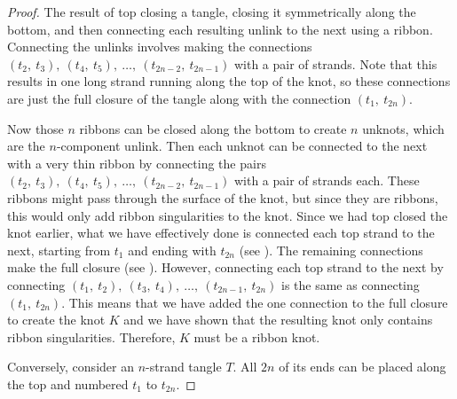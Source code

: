\begin{paper}
\begin{proof}
{The result of top closing a tangle, closing it symmetrically
along the bottom, and then connecting each resulting unlink to the next using a
ribbon.
Connecting the unlinks involves making the connections
$(t_2,~t_3),~(t_4,~t_5),~\dots,~(t_{2n-2},~t_{2n-1})$ with a pair of strands.
Note that this results in one long strand running along the top of the knot, so
these connections are just the full closure of the tangle along with the
connection $(t_1,~t_{2n})$.}

Now those $n$ ribbons can be closed along the bottom to create $n$ unknots,
which are the $n$-component unlink.
Then each unknot can be connected to the next with a very thin ribbon by
connecting the pairs $(t_2,~t_3),~(t_4,~t_5),~\dots,~(t_{2n-2},~t_{2n-1})$ with
a pair of strands each.
These ribbons might pass through the surface of the knot, but since they are
ribbons, this would only add ribbon singularities to the knot.
Since we had top closed the knot earlier, what we have effectively done is
connected each top strand to the next, starting from $t_1$ and ending with
$t_{2n}$ (see \figProof).
The remaining connections make the full closure (see \figFull).
However, connecting each top strand to the next by connecting
$(t_1,~t_2),~(t_3,~t_4),~\dots,~(t_{2n-1},~t_{2n})$ is the same as connecting
$(t_1,~t_{2n})$.
This means that we have added the one connection to the full closure to create
the knot $K$ and we have shown that the resulting knot only contains ribbon
singularities.
Therefore, $K$ must be a ribbon knot.

Conversely, consider an $n$-strand tangle $T$.
All $2n$ of its ends can be placed along the top and numbered $t_1$ to $t_{2n}$.

\end{proof}
\end{paper}
